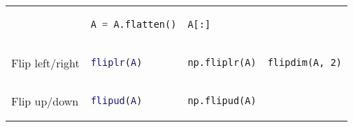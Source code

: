 \begin{tabular}[]{@{}llll@{}}
\begin{minipage}[t]{0.23\columnwidth}
\end{minipage} & \begin{minipage}[t]{0.20\columnwidth}\raggedright
\begin{lstlisting}[language=Python]
A = A.flatten()
\end{lstlisting}

\end{minipage} & \begin{minipage}[t]{0.20\columnwidth}\raggedright
\begin{lstlisting}
A[:]
\end{lstlisting}

\end{minipage}\tabularnewline
\begin{minipage}[t]{0.24\columnwidth}\raggedright
Flip left/right
\end{minipage} & \begin{minipage}[t]{0.23\columnwidth}\raggedright
\begin{lstlisting}[language=Matlab]
fliplr(A)
\end{lstlisting}

\end{minipage} & \begin{minipage}[t]{0.20\columnwidth}\raggedright
\begin{lstlisting}[language=Python]
np.fliplr(A)
\end{lstlisting}

\end{minipage} & \begin{minipage}[t]{0.20\columnwidth}\raggedright
\begin{lstlisting}
flipdim(A, 2)
\end{lstlisting}

\end{minipage}\tabularnewline
\begin{minipage}[t]{0.24\columnwidth}\raggedright
Flip up/down
\end{minipage} & \begin{minipage}[t]{0.23\columnwidth}\raggedright
\begin{lstlisting}[language=Matlab]
flipud(A)
\end{lstlisting}

\end{minipage} & \begin{minipage}[t]{0.20\columnwidth}\raggedright
\begin{lstlisting}[language=Python]
np.flipud(A)
\end{lstlisting}


\end{minipage}
\end{tabular}
